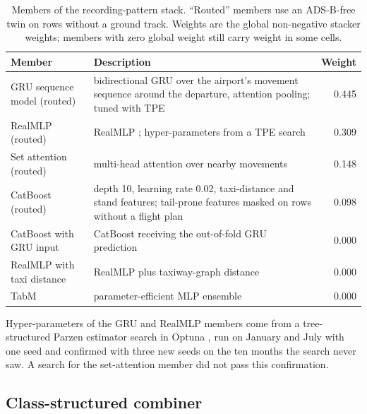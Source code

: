 \documentclass[
  manuscript=article,  %
  layout=preprint,  %
  year=20xx,
  volume=x,
]{extra/joas}
\begin{document}
\begin{table}[htbp!]
  \centering
  \small
  \caption{Members of the recording-pattern stack. ``Routed'' members use an ADS-B-free twin on rows without a ground track. Weights are the global non-negative stacker weights; members with zero global weight still carry weight in some cells.}
  \label{tb:stack}
  \begin{tabular}{p{}p{}r}
  \toprule
  \textbf{Member} & \textbf{Description} & \textbf{Weight} \\
  \midrule
  GRU sequence model (routed) & bidirectional GRU \cite{cho2014learning,schuster1997bidirectional} over the airport's movement sequence around the departure, attention pooling; tuned with TPE & 0.445 \\
  RealMLP (routed) & RealMLP \cite{holzmuller2024better}; hyper-parameters from a TPE search & 0.309 \\
  Set attention (routed) & multi-head attention \cite{vaswani2017attention,lee2019set} over nearby movements & 0.148 \\
  CatBoost (routed) & depth 10, learning rate 0.02, taxi-distance and stand features; tail-prone features masked on rows without a flight plan & 0.098 \\
  CatBoost with GRU input & CatBoost receiving the out-of-fold GRU prediction & 0.000 \\
  RealMLP with taxi distance & RealMLP plus taxiway-graph distance & 0.000 \\
  TabM & parameter-efficient MLP ensemble \cite{gorishniy2025tabm,wen2020batchensemble} & 0.000 \\
  \bottomrule
  \end{tabular}
\end{table}

Hyper-parameters of the GRU and RealMLP members come from a tree-structured Parzen estimator search \cite{bergstra2011algorithms} in Optuna \cite{akiba2019optuna}, run on January and July with one seed and confirmed with three new seeds on the ten months the search never saw. A search for the set-attention member did not pass this confirmation.

\subsection{Class-structured combiner}
\label{sec:combiner}
\end{document}
